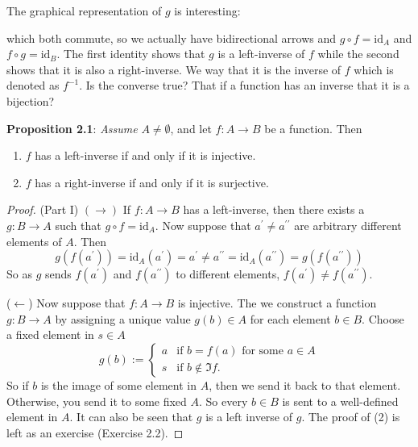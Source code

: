 \documentclass{report}
\begin{document}
The graphical representation of $g$ is interesting:
        \begin{center}
        \end{center}
    which both commute, so we actually have bidirectional arrows and $g \circ f = \text{id}_{A}$ and $f \circ g = \text{id}_{B}$. The first identity shows that $g$ is a left-inverse of $f$ while the second shows that it is also a right-inverse. We way that it is the inverse of $f$ which is denoted as $f^{-1}$. Is the converse true? That if a function has an inverse that it is a bijection?

\textbf{Proposition 2.1}: \textit{Assume} $A \neq \emptyset$, and let $f : A \rightarrow B$ be a function. Then
    \begin{enumerate}
        \item $f$ has a left-inverse if and only if it is injective.

        \item $f$ has a right-inverse if and only if it is surjective. 
    \end{enumerate}

\begin{proof}
    (Part I) $(\rightarrow )$ If $f : A \rightarrow B$ has a left-inverse, then there exists a $g : B \rightarrow A$ such that $g \circ f = \text{id}_{A}$. Now suppose that $a^{\prime} \neq a^{\prime\prime}$ are arbitrary different elements of $A$. Then
        \begin{equation*}
            g(f(a^{\prime})) = \text{id}_{A}(a^{\prime}) = a^{\prime} \neq a^{\prime\prime} = \text{id}_{A}(a^{\prime\prime}) = g(f(a^{\prime\prime}))
        \end{equation*}
        So as $g$ sends $f(a^{\prime})$ and $f(a^{\prime\prime})$ to different elements, $f(a^{\prime}) \neq f(a^{\prime\prime})$. 

    ($\leftarrow $) Now suppose that $f : A \rightarrow B$ is injective. The we construct a function $g : B \rightarrow A$ by assigning a unique value $g(b) \in A$ for each element $b \in B$. Choose a fixed element in $s \in A$
        \begin{equation*}
            g(b) := 
                \begin{cases}
                    a & \text{if } b = f(a) \text{ for some $a \in A$} \\
                    s & \text{if } b \notin \Im{f}.
                \end{cases}
        \end{equation*}
        So if $b$ is the image of some element in $A$, then we send it back to that element. Otherwise, you send it to some fixed $A$. So every $b \in B$ is sent to a well-defined element in $A$. It can also be seen that $g$ is a left inverse of $g$. The proof of (2) is left as an exercise (Exercise 2.2).
\end{proof}
\end{document}
